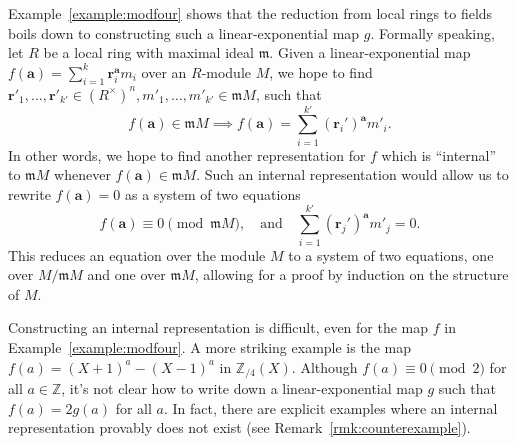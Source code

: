 \documentclass[letterpaper, 11pt, thm-restate]{article}
\numberwithin{equation}{section}
\newcommand{\Z}{\mathbb{Z}}
\newcommand{\ba}{\boldsymbol{a}}
\newcommand{\br}{\boldsymbol{r}}
\newcommand{\frm}{\mathfrak{m}}
\theoremstyle{definition}
\theoremstyle{definition}
\theoremstyle{definition}
\begin{document}
Example~\ref{example:modfour} shows that the reduction from local rings to fields boils down to constructing such a linear-exponential map $g$.
Formally speaking, let $R$ be a local ring with maximal ideal $\frm$.
Given a linear-exponential map $f(\ba)=\sum_{i = 1}^k \br_i^{\ba} m_i$ over an $R$-module $M$, we hope to find $\br'_1, \ldots, \br'_{k'}\in (R^{\times})^n, m'_1, \ldots, m'_{k'}\in \frm M$, such that 
\[
f(\ba) \in \frm M \implies f(\ba) = \sum_{i = 1}^{k'}(\br_i')^{\ba} m'_i.
\]
In other words, we hope to find another representation for $f$ which is ``internal'' to $\frm M$ whenever $f(\ba) \in \frm M$.
Such an internal representation would allow us to rewrite $f(\ba) = 0$ as a system of two equations 
\[
f(\ba) \equiv 0 \pmod{\frm M}, \quad \text{and} \quad \sum_{i = 1}^{k'}(\br_j')^{\ba} m'_j = 0.
\]
This reduces an equation over the module $M$ to a system of two equations, one over $M/\frm M$ and one over $\frm M$, allowing for a proof by induction on the structure of $M$.

Constructing an internal representation is difficult, even for the map $f$ in Example~\ref{example:modfour}.
A more striking example is the map $f(a) = (X+1)^a - (X-1)^a$ in $\Z_{/4}(X)$.
Although $f(a) \equiv 0 \pmod 2$ for all $a \in \Z$, it's not clear how to write down a linear-exponential map $g$ such that $f(a) = 2g(a)$ for all $a$.
In fact, there are explicit examples where an internal representation provably does not exist (see Remark~\ref{rmk:counterexample}).
\end{document}

